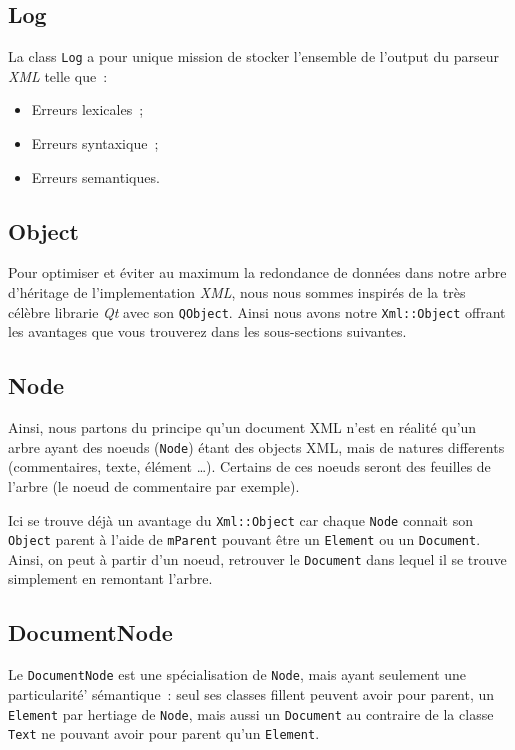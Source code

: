    \subsection{Log}
        La class \lstinline$Log$ a pour unique mission de stocker l'ensemble de l'output du parseur \textit{XML} telle que~:

        \begin{itemize}
            \item Erreurs lexicales~;
            \item Erreurs syntaxique~;
            \item Erreurs semantiques.
        \end{itemize}

    \subsection{Object}
        Pour optimiser et éviter au maximum la redondance de données dans notre arbre d'héritage de l'implementation \textit{XML}, nous nous sommes inspirés de la très célèbre librarie \textit{Qt} avec son \lstinline$QObject$. Ainsi nous avons notre \lstinline$Xml::Object$ offrant les avantages que vous trouverez dans les sous-sections suivantes.

    \subsection{Node}
    Ainsi, nous partons du principe qu'un document XML n'est en réalité qu'un arbre ayant des noeuds (\lstinline$Node$) étant des objects XML, mais de natures differents (commentaires, texte, élément \ldots). Certains de ces noeuds seront des feuilles de l'arbre (le noeud de commentaire par exemple).

        Ici se trouve déjà un avantage du \lstinline$Xml::Object$ car chaque \lstinline$Node$ connait son \lstinline$Object$ parent à l'aide de \lstinline$mParent$ pouvant être un \lstinline$Element$ ou un \lstinline$Document$. Ainsi, on peut à partir d'un noeud, retrouver le \lstinline$Document$ dans lequel il se trouve simplement en remontant l'arbre.

    \subsection{DocumentNode}
        Le \lstinline$DocumentNode$ est une spécialisation de \lstinline$Node$, mais ayant seulement une particularité' sémantique~: seul ses classes fillent peuvent avoir pour parent, un \lstinline$Element$ par hertiage de \lstinline$Node$, mais aussi un \lstinline$Document$ au contraire de la classe \lstinline$Text$ ne pouvant avoir pour parent qu'un \lstinline$Element$.

